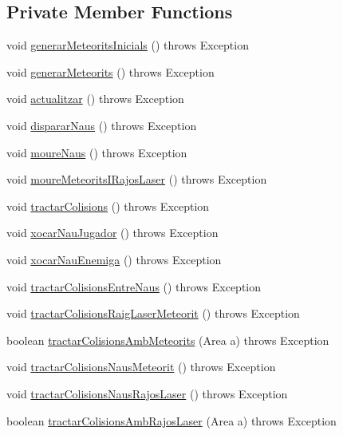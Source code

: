 \subsection*{Private Member Functions}
\begin{DoxyCompactItemize}
\item 
void \hyperlink{class_joc_ab4169a454c9b3b6b6030fd785483a15d}{generar\+Meteorits\+Inicials} ()  throws Exception 
\item 
void \hyperlink{class_joc_afb711913c78395c05839c3f775792beb}{generar\+Meteorits} ()  throws Exception 
\item 
void \hyperlink{class_joc_aafe85787281ae19be9ee44aabc5c116c}{actualitzar} ()  throws Exception 
\item 
void \hyperlink{class_joc_a82b3c98f504183b2ade08ae6f7fbbdce}{disparar\+Naus} ()  throws Exception 
\item 
void \hyperlink{class_joc_a9b0d8fa2d2613d958dc8bf650ae78a34}{moure\+Naus} ()  throws Exception 
\item 
void \hyperlink{class_joc_af9e0ddcc5b82db8ff4d07bbd443c7f8d}{moure\+Meteorits\+I\+Rajos\+Laser} ()  throws Exception 
\item 
void \hyperlink{class_joc_a1be330c10f1e2ee06f696e0a0bdec7c7}{tractar\+Colisions} ()  throws Exception 
\item 
void \hyperlink{class_joc_a471c58ad94b7a8732a6b3e4695f2a691}{xocar\+Nau\+Jugador} ()  throws Exception 
\item 
void \hyperlink{class_joc_a84da80994a7dd370b3772cf962500617}{xocar\+Nau\+Enemiga} ()  throws Exception 
\item 
void \hyperlink{class_joc_abc5db47ede50ddeccb50b2872d05cb6c}{tractar\+Colisions\+Entre\+Naus} ()  throws Exception 
\item 
void \hyperlink{class_joc_af98e590d50e512af30830099af4f6173}{tractar\+Colisions\+Raig\+Laser\+Meteorit} ()  throws Exception 
\item 
boolean \hyperlink{class_joc_ae0497743329d920a47ed01f96e02a04f}{tractar\+Colisions\+Amb\+Meteorits} (Area a)  throws Exception 
\item 
void \hyperlink{class_joc_acf31c665e8f734f15f40f8e6792e8bba}{tractar\+Colisions\+Naus\+Meteorit} ()  throws Exception 
\item 
void \hyperlink{class_joc_a9ccc5adec1e7efdd6c01ba393d3686c6}{tractar\+Colisions\+Naus\+Rajos\+Laser} ()  throws Exception 
\item 
boolean \hyperlink{class_joc_ac94f4a327797f506171f0db74b3feaee}{tractar\+Colisions\+Amb\+Rajos\+Laser} (Area a)  throws Exception 
\end{DoxyCompactItemize}


